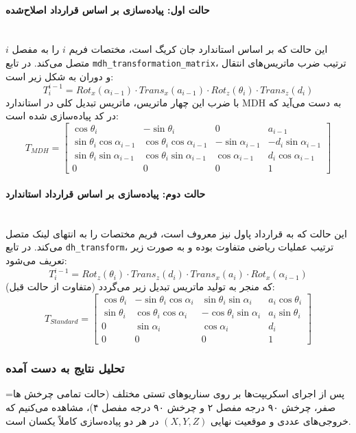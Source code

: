 \documentclass{article}
\begin{document}
\paragraph{حالت اول: پیاده‌سازی بر اساس قرارداد اصلاح‌شده }\mbox{}\\ 
این حالت که بر اساس استاندارد جان کریگ  است، مختصات فریم $i$ را به مفصل $i$ متصل می‌کند. در تابع \texttt{mdh\_transformation\_matrix}، ترتیب ضرب ماتریس‌های انتقال و دوران به شکل زیر است:
$$ T_{i}^{i-1} = Rot_x(\alpha_{i-1}) \cdot Trans_x(a_{i-1}) \cdot Rot_z(\theta_i) \cdot Trans_z(d_i) $$
با ضرب این چهار ماتریس، ماتریس تبدیل کلی در استاندارد MDH به دست می‌آید که در کد پیاده‌سازی شده است:
$$ T_{MDH} = \begin{bmatrix} 
	\cos\theta_i & -\sin\theta_i & 0 & a_{i-1} \\ 
	\sin\theta_i \cos\alpha_{i-1} & \cos\theta_i \cos\alpha_{i-1} & -\sin\alpha_{i-1} & -d_i \sin\alpha_{i-1} \\ 
	\sin\theta_i \sin\alpha_{i-1} & \cos\theta_i \sin\alpha_{i-1} & \cos\alpha_{i-1} & d_i \cos\alpha_{i-1} \\ 
	0 & 0 & 0 & 1 
\end{bmatrix} $$

\paragraph{حالت دوم: پیاده‌سازی بر اساس قرارداد استاندارد }\mbox{}\\
این حالت که به قرارداد پاول  نیز معروف است، فریم مختصات را به انتهای لینک متصل می‌کند. در تابع \texttt{dh\_transform}، ترتیب عملیات ریاضی متفاوت بوده و به صورت زیر تعریف می‌شود:
$$ T_{i}^{i-1} = Rot_z(\theta_i) \cdot Trans_z(d_i) \cdot Trans_x(a_i) \cdot Rot_x(\alpha_{i-1}) $$
که منجر به تولید ماتریس تبدیل زیر می‌گردد (متفاوت از حالت قبل):
$$ T_{Standard} = \begin{bmatrix} 
	\cos\theta_i & -\sin\theta_i \cos\alpha_i & \sin\theta_i \sin\alpha_i & a_i \cos\theta_i \\ 
	\sin\theta_i & \cos\theta_i \cos\alpha_i & -\cos\theta_i \sin\alpha_i & a_i \sin\theta_i \\ 
	0 & \sin\alpha_i & \cos\alpha_i & d_i \\ 
	0 & 0 & 0 & 1 
\end{bmatrix} $$

\subsubsection{تحلیل نتایج به دست آمده}
پس از اجرای اسکریپت‌ها بر روی سناریوهای تستی مختلف (حالت تمامی چرخش ها= صفر، چرخش ۹۰ درجه مفصل ۲ و چرخش ۹۰ درجه مفصل ۴)، مشاهده می‌کنیم که خروجی‌های عددی و موقعیت نهایی $(X, Y, Z)$ در هر دو پیاده‌سازی کاملاً یکسان است. 
\end{document}
